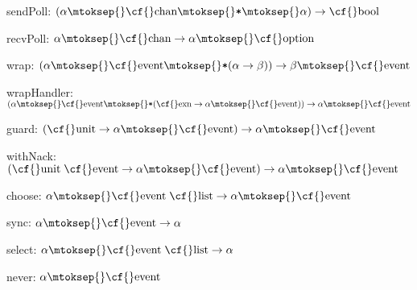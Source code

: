 \begin{interface}
\Nopagebreak
\item {}{} {\cf sendPoll: \((\alpha\mtoksep{}\mbox{\cf{}chan}\mtoksep{}\verb,*,\mtoksep{}\alpha)\rightarrow \mbox{\cf{}bool}\)}

\Nopagebreak
\item {}{} {\cf recvPoll: \(\alpha\mtoksep{}\mbox{\cf{}chan}\rightarrow \alpha\mtoksep{}\mbox{\cf{}option}\)}

\Nopagebreak
\item {}{} {\cf wrap: \((\alpha\mtoksep{}\mbox{\cf{}event}\mtoksep{}\verb,*,(\alpha\rightarrow \beta))\rightarrow \beta\mtoksep{}\mbox{\cf{}event}\)}

\Nopagebreak
\item {}{} {\cf wrapHandler: \((\alpha\mtoksep{}\mbox{\cf{}event}\mtoksep{}\verb,*,(\mbox{\cf{}exn}\rightarrow \alpha\mtoksep{}\mbox{\cf{}event}))\rightarrow \alpha\mtoksep{}\mbox{\cf{}event}\)}

\Nopagebreak
\item {}{} {\cf guard: \((\mbox{\cf{}unit}\rightarrow \alpha\mtoksep{}\mbox{\cf{}event})\rightarrow \alpha\mtoksep{}\mbox{\cf{}event}\)}

\Nopagebreak
\item {}{} {\cf withNack: \((\mbox{\cf{}unit}\;\mbox{\cf{}event}\rightarrow \alpha\mtoksep{}\mbox{\cf{}event})\rightarrow \alpha\mtoksep{}\mbox{\cf{}event}\)}

\Nopagebreak
\item {}{} {\cf choose: \(\alpha\mtoksep{}\mbox{\cf{}event}\;\mbox{\cf{}list}\rightarrow \alpha\mtoksep{}\mbox{\cf{}event}\)}

\Nopagebreak
\item {}{} {\cf sync: \(\alpha\mtoksep{}\mbox{\cf{}event}\rightarrow \alpha\)}

\Nopagebreak
\item {}{} {\cf select: \(\alpha\mtoksep{}\mbox{\cf{}event}\;\mbox{\cf{}list}\rightarrow \alpha\)}

\Nopagebreak
\item {}{} {\cf never: \(\alpha\mtoksep{}\mbox{\cf{}event}\)}


\end{interface}
